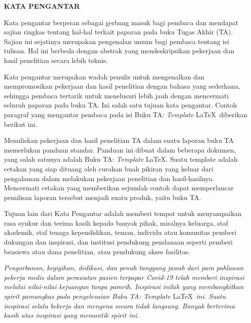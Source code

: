 \clearpage
{}
{}
\begin{center}
 \textbf{\large KATA PENGANTAR}\\[3em]
\end{center}

\noindent Kata pengantar berperan sebagai gerbang masuk bagi pembaca dan mendapat sajian ringkas tentang hal-hal terkait paparan pada buku Tugas Akhir (TA). Sajian ini sejatinya merupakan pengenalan umum bagi pembaca tentang isi tulisan. Hal ini berbeda dengan abstrak yang mendeskripsikan pekerjaan dan hasil penelitian secara lebih teknis.

Kata pengantar merupakan wadah penulis untuk mengenalkan dan mempromosikan pekerjaan dan hasil penelitian dengan bahasa yang sederhana, sehingga pembaca tertarik untuk menelusuri lebih jauh dengan mencermati seluruh paparan pada buku TA. Ini salah satu tujuan kata pengantar. Contoh paragraf yang mengantar pembaca pada isi Buku TA: \textit{Template} \LaTeX\ diberikan berikut ini.

Menuliskan pekerjaan dan hasil penelitian TA dalam suatu laporan buku TA memerlukan panduan standar. Panduan ini dibuat dalam beberapa dokumen, yang salah satunya adalah Buku TA: \textit{Template} \LaTeX. Suatu template adalah cetakan yang siap dituang oleh curahan buah pikiran yang keluar dari pengalaman dalam melakukan pekerjaan penelitian dan hasil-hasilnya. Mencermati cetakan yang memberikan sejumlah contoh dapat memperlancar penulisan laporan tersebut menjadi suatu produk, yaitu buku TA.

Tujuan lain dari Kata Pengantar adalah memberi tempat untuk menyampaikan rasa syukur dan terima kasih kepada banyak pihak, misalnya keluarga, staf akademik, staf tenaga kependidikan, teman, individu atau komunitas pemberi dukungan dan inspirasi, dan institusi pendukung pendanaan seperti pemberi beasiswa atau dana penelitian, atau pendukung akses fasilitas.

\textit{Pengorbanan, kegigihan, dedikasi, dan penuh tanggung jawab dari para pahlawan pekerja medis dalam perawatan pasien terpapar Covid-19 telah memberi inspirasi melalui nilai-nilai kejuangan tanpa pamrih. Inspirasi inilah yang membangkitkan spirit pamungkas pada penyelesaian Buku TA: Template} \LaTeX\ \textit{ini. Suatu inspirasi selalu bekerja dan mengena secara tidak langsung. Banyak berterima kasih atas inspirasi yang memantik spirit ini.}


